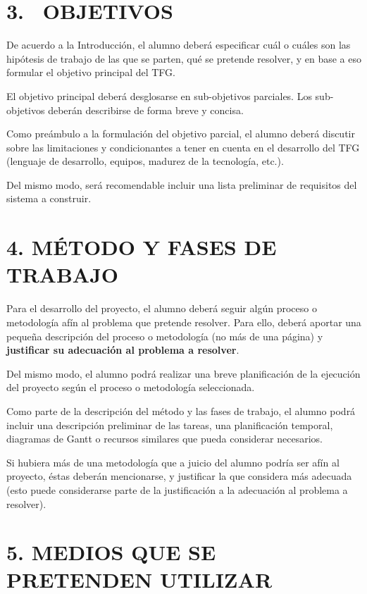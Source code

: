\documentclass[a4paper]{article}
\begin{document}
\bigskip

\section{3. \ OBJETIVOS}
De acuerdo a la Introducci\'on, el alumno deber\'a especificar cu\'al o cuáles son las hip\'otesis de trabajo de las
que se parten, qu\'e se pretende resolver, y en base a eso formular el objetivo principal del TFG.

El objetivo principal deber\'a desglosarse en sub-objetivos parciales. Los sub-objetivos deberán describirse de forma breve y concisa.

Como pre\'ambulo a la formulaci\'on del objetivo parcial, el alumno deber\'a discutir sobre las limitaciones y
condicionantes a tener en cuenta en el desarrollo del TFG (lenguaje de desarrollo, equipos, madurez de la tecnolog\'ia,
etc.).

Del mismo modo, ser\'a recomendable incluir una lista preliminar de requisitos del sistema a construir.

\section[4. M\'ETODO Y FASES DE TRABAJO]{4. M\'ETODO Y FASES DE TRABAJO}

\bigskip

Para el desarrollo del proyecto, el alumno deber\'a seguir alg\'un proceso o metodolog\'ia af\'in al problema que
pretende resolver. Para ello, deber\'a aportar una peque\~na descripci\'on del proceso o metodolog\'ia (no m\'as de una
p\'agina) y \textbf{justificar su adecuaci\'on al problema a resolver}.

Del mismo modo, el alumno podrá realizar una breve planificaci\'on de la ejecuci\'on del proyecto seg\'un el proceso
o metodolog\'ia seleccionada.

Como parte de la descripci\'on del m\'etodo y las fases de trabajo, el alumno podr\'a incluir una descripci\'on
preliminar de las tareas, una planificaci\'on temporal, diagramas de Gantt o recursos similares que pueda considerar
necesarios.

Si hubiera m\'as de una metodolog\'ia que a juicio del alumno podr\'ia ser af\'in al proyecto, \'estas deber\'an
mencionarse, y justificar la que considera m\'as adecuada (esto puede considerarse parte de la justificaci\'on a la
adecuaci\'on al problema a resolver).

\section{5. MEDIOS QUE SE PRETENDEN UTILIZAR}
\end{document}
